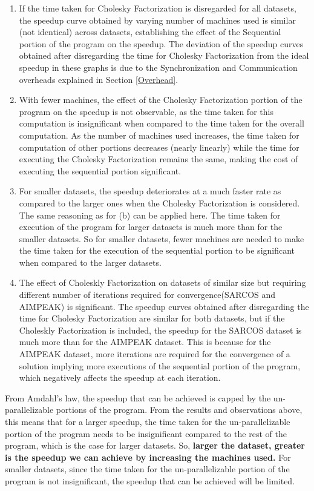 \documentclass[12pt]{article}
\begin{document}
\begin{enumerate}[label=(\alph*)]
\item If the time taken for Cholesky Factorization is disregarded for all datasets, the speedup curve obtained by varying number of machines used is similar (not identical) across datasets, establishing the effect of the Sequential portion of the program on the speedup. The deviation of the speedup curves obtained after disregarding the time for Cholesky Factorization from the ideal speedup in these graphs is due to the Synchronization and Communication overheads explained in Section \ref{Overhead}.
\item With fewer machines, the effect of the Cholesky Factorization portion of the program on the speedup is not observable, as the time taken for this computation is insignificant when compared to the time taken for the overall computation. As the number of machines used increases, the time taken for computation of other portions decreases (nearly linearly) while the time for executing the Cholesky Factorization remains the same, making the cost of executing the sequential portion significant.
\item For smaller datasets, the speedup deteriorates at a much faster rate as compared to the larger ones when the Cholesky Factorization is considered. The same reasoning as for (b) can be applied here. The time taken for execution of the program for larger datasets is much more than for the smaller datasets. So for smaller datasets, fewer machines are needed to make the time taken for the execution of the sequential portion to be significant when compared to the larger datasets.
\item The effect of Choleskly Factorization on datasets of similar size but requiring different number of iterations required for convergence(SARCOS and AIMPEAK) is significant. The speedup curves obtained after disregarding the time for Cholesky Factorization are similar for both datasets, but if the Choleskly Factorization is included, the speedup for the SARCOS dataset is much more than for the AIMPEAK dataset. This is because for the AIMPEAK dataset, more iterations are required for the convergence of a solution implying more executions of the sequential portion of the program, which negatively affects the speedup at each iteration.
\end{enumerate}
From Amdahl's law, the speedup that can be achieved is capped by the un-parallelizable portions of the program. From the results and observations above, this means that for a larger speedup, the time taken for the un-parallelizable portion of the program needs to be insignificant compared to the rest of the program, which is the case for larger datasets. So, {\bf larger the dataset, greater is the speedup we can achieve by increasing the machines used.} For smaller datasets, since the time taken for the un-parallelizable portion of the program is not insignificant, the speedup that can be achieved will be limited.
\end{document}
